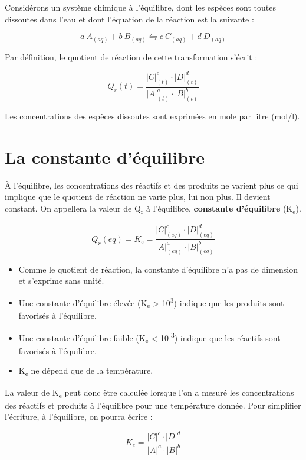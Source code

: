 \documentclass[
  11pt,
  a4paper,
  openany]{book}
\providecommand{\tightlist}{%
  \setlength{\itemsep}{0pt}\setlength{\parskip}{0pt}}
\begin{document}
Considérons un système chimique à l'équilibre, dont les espèces sont toutes dissoutes dans l'eau et dont l'équation de la réaction est la suivante :

\[
  a\ A_{(aq)} + b\ B_{(aq)} \leftrightharpoons c\ C_{(aq)} + d\ D_{(aq)}
\]

Par définition, le quotient de réaction de cette transformation s'écrit :

\[
  Q_{r}(t) = \frac{|C|_{(t)}^{c} \cdot |D|_{(t)}^{d}}{|A|_{(t)}^{a} \cdot |B|_{(t)}^{b}}
\]

Les concentrations des espèces dissoutes sont exprimées en mole par litre (mol/l).

\hypertarget{la-constante-duxe9quilibre}{%
\section{La constante d'équilibre}\label{la-constante-duxe9quilibre}}

À l'équilibre, les concentrations des réactifs et des produits ne varient plus ce qui implique que le quotient de réaction ne varie plus, lui non plus. Il devient constant. On appellera la valeur de Q\textsubscript{r} à l'équilibre, \textbf{constante d'équilibre} (K\textsubscript{e}).

\[
  Q_{r}(eq) = K_{e} = \frac{|C|_{(eq)}^{c} \cdot |D|_{(eq)}^{d}}{|A|_{(eq)}^{a} \cdot |B|_{(eq)}^{b}}
\]

\begin{itemize}
\tightlist
\item
  Comme le quotient de réaction, la constante d'équilibre n'a pas de dimension et s'exprime sans unité.
\item
  Une constante d'équilibre élevée (K\textsubscript{e} \textgreater{} 10\textsuperscript{3}) indique que les produits sont favorisés à l'équilibre.
\item
  Une constante d'équilibre faible (K\textsubscript{e} \textless{} 10\textsuperscript{-3}) indique que les réactifs sont favorisés à l'équilibre.
\item
  K\textsubscript{e} ne dépend que de la température.
\end{itemize}

La valeur de K\textsubscript{e} peut donc être calculée lorsque l'on a mesuré les concentrations des réactifs et produits à l'équilibre pour une température donnée. Pour simplifier l'écriture, à l'équilibre, on pourra écrire :

\[
  K_{e} = \frac{|C|^{c} \cdot |D|^{d}}{|A|^{a} \cdot |B|^{b}}
\]
\end{document}
